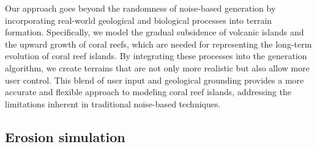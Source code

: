 Our approach goes beyond the randomness of noise-based generation by incorporating real-world geological and biological processes into terrain formation. Specifically, we model the gradual subsidence of volcanic islands and the upward growth of coral reefs, which are needed for representing the long-term evolution of coral reef islands. By integrating these processes into the generation algorithm, we create terrains that are not only more realistic but also allow more user control. This blend of user input and geological grounding provides a more accurate and flexible approach to modeling coral reef islands, addressing the limitations inherent in traditional noise-based techniques.

\subsection{Erosion simulation}

